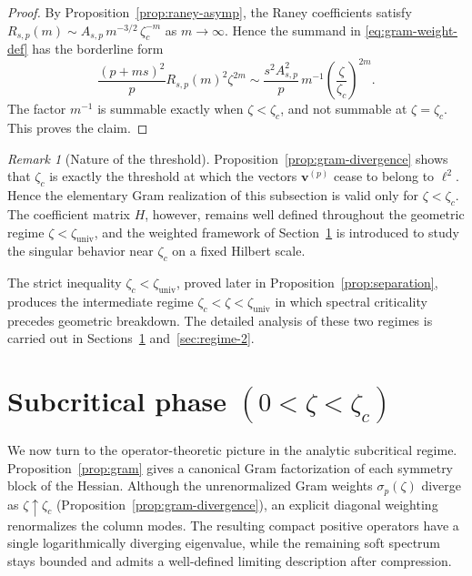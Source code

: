 \documentclass[11pt]{amsart}
\numberwithin{equation}{section}
\theoremstyle{plain}
\theoremstyle{definition}
\theoremstyle{remark}
\newtheorem{remark}[theorem]{Remark}
\begin{document}
\begin{proof}
	By Proposition~\ref{prop:raney-asymp}, the Raney coefficients satisfy
	$R_{s,p}(m) \sim A_{s,p} \, m^{-3/2} \, \zeta_c^{-m}$ as
	$m \to \infty$. Hence the summand in \eqref{eq:gram-weight-def} has the
	borderline form
	\[
		\frac{(p+ms)^2}{p} R_{s,p}(m)^2 \zeta^{2m}
		\sim \frac{s^2 A_{s,p}^2}{p} \, m^{-1}
		\left(\frac{\zeta}{\zeta_c}\right)^{2m}.
	\]
	The factor $m^{-1}$ is summable exactly when $\zeta<\zeta_c$, and not
	summable at $\zeta=\zeta_c$. This proves the claim.
\end{proof}

\begin{remark}[Nature of the threshold]
	\label{rem:threshold-nature}
	Proposition~\ref{prop:gram-divergence} shows that $\zeta_c$ is exactly the
	threshold at which the vectors $\bm v^{(p)}$ cease to belong to $\ell^2$.
	Hence the elementary Gram realization of this subsection is valid only for
	$\zeta<\zeta_c$. The coefficient matrix \(H\), however, remains well defined
	throughout the geometric regime \(\zeta<\zeta_{\mathrm{univ}}\), and the
	weighted framework of Section~\ref{sec:regime-I} is introduced to study the
	singular behavior near \(\zeta_c\) on a fixed Hilbert scale.
\end{remark}

The strict inequality \(\zeta_c<\zeta_{\mathrm{univ}}\), proved later in
Proposition~\ref{prop:separation}, produces the intermediate regime
\(\zeta_c<\zeta<\zeta_{\mathrm{univ}}\) in which spectral criticality
precedes geometric breakdown. The detailed analysis of these two regimes is
carried out in Sections~\ref{sec:regime-I} and~\ref{sec:regime-2}.





\section{Subcritical phase \texorpdfstring{$(0<\zeta<\zeta_c)$}{(0<zeta<zeta_c)}}
\label{sec:regime-I}


We now turn to the operator-theoretic picture in the analytic subcritical
regime. Proposition~\ref{prop:gram} gives a canonical Gram factorization of
each symmetry block of the Hessian. Although the unrenormalized Gram weights
$\sigma_p(\zeta)$ diverge as $\zeta\uparrow\zeta_c$
(Proposition~\ref{prop:gram-divergence}), an explicit diagonal weighting
renormalizes the column modes. The resulting compact positive operators have a
single logarithmically diverging eigenvalue, while the remaining soft
spectrum stays bounded and admits a well-defined limiting description after
compression.
\end{document}
